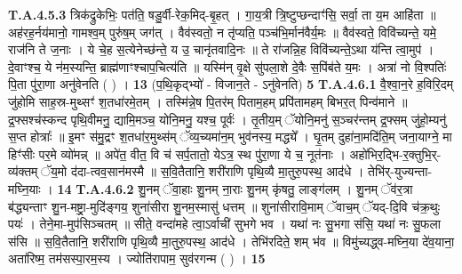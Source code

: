 \documentclass[17pt]{extarticle}
\begin{document}
                  \newline
                                                                  \textbf{ T.A.4.5.3} \newline
                  त्रिक॑द्रुकेभिः॒ पत॑ति॒ षडु॒र्वी-रेक॒मिद्-बृ॒हत् ।  गा॒य॒त्री त्रि॒ष्टुप्छन्दाꣳ॑सि॒ सर्वा॒ ता य॒म आहि॑ता ॥  अह॑रह॒र्नय॑मानो॒ गामश्व॒म् पुरु॑ष॒म् जग॑त् ।  वैव॑स्वतो॒ न तृ॑प्यति॒ पञ्च॑भि॒र्मान॑वैर्य॒मः ॥  वैव॑स्वते॒ विवि॑च्यन्ते॒ यमे॒ राज॑नि ते ज॒नाः ।  ये चे॒ह स॒त्येनेच्छ॑न्ते॒ य उ॒ चानृ॑तवादि॒नः ॥  ते रा॑जन्नि॒ह विवि॑च्यन्ते॒ऽथा य॑न्ति त्वा॒मुप॑ ।  दे॒वाꣳश्च॒ ये न॑म॒स्यन्ति॒ ब्राह्म॑णाꣳश्चाप॒चित्य॑ति ॥  यस्मि॑न् वृ॒क्षे सु॑पला॒शे दे॒वैः स॒पिंब॑ते य॒मः ।  अत्रा॑ नो वि॒श्पतिः॑ पि॒ता पु॑रा॒णा अनु॑वेनति ( ) । \textbf{ 13} \newline
                  \newline
                                                        (प॒थि॒कृद्भ्यो॑ - विजान॒ते - ऽनु॑वेनति) \textbf{5} \newline \newline
                                \textbf{ T.A.4.6.1} \newline
                  वै॒श्वा॒न॒रे ह॒विरि॒दम् जु॑होमि साह॒स्र-मुथ्सꣳ॑ श॒तधा॑रमे॒तम् । तस्मि॑न्ने॒ष पि॒तर॑म् पिताम॒हम् प्रपि॑तामहम् बिभर॒त् पिन्व॑माने ॥  द्र॒फ्सश्च॑स्कन्द पृथि॒वीमनु॒ द्यामि॒मञ्च॒ योनि॒मनु॒ यश्च॒ पूर्वः॑ ।  तृ॒तीय॒म् ॅयोनि॒मनु॑ स॒ञ्चर॑न्तम् द्र॒फ्सम् जु॑हो॒म्यनु॑ स॒प्त होत्राः᳚ ॥  इ॒मꣳ स॑मु॒द्रꣳ श॒तधा॑र॒मुथ्स॑म् ॅव्य॒च्यमा॑न॒म् भुव॑नस्य॒ मद्ध्ये᳚ ।  घृ॒तम् दुहा॑ना॒मदि॑ति॒म् जना॒याग्ने॒ मा हिꣳ॑सीः पर॒मे व्यो॑मन्न् ॥ अपे॑त॒ वीत॒ वि च॑ सर्प॒तातो॒ येऽत्र॒ स्थ पु॑रा॒णा ये च॒ नूत॑नाः ।  अहो॑भिर॒द्भि-र॒क्तुभि॒र्-व्य॑क्तम् ॅय॒मो द॑दा-त्वव॒सान॑मस्मै ॥ स॒वि॒तैतानि॒ शरी॑राणि पृथि॒व्यै मा॒तुरु॒पस्थ॒ आद॑धे ।  तेभि॑र्-युज्यन्ता-मघ्नि॒याः । \textbf{ 14} \newline
                  \newline
                                                                  \textbf{ T.A.4.6.2} \newline
                  शु॒नम् ॅवा॒हाः शु॒नम् ना॒राः शु॒नम् कृ॑षतु॒ लाङ्ग॑लम् ।  शु॒नम् ॅव॑र॒त्रा ब॑द्ध्यन्ताꣳ शु॒न-मष्ट्रा॒-मुदि॑ङ्गय॒ शुना॑सीरा शु॒नम॒स्मासु॑ धत्तम् ॥  शुना॑सीरावि॒माम् ॅवाच॒म् ॅयद्-दि॒वि च॑क्र॒थुः पयः॑ । तेने॒मा-मुप॑सिञ्चतम् ॥  सीते॒ वन्दा॑महे त्वा॒ऽर्वाची॑ सुभगे भव ।  यथा॑ नः सु॒भगा स॑सि॒ यथा॑ नः सु॒फला स॑सि ॥  स॒वि॒तैतानि॒ शरी॑राणि पृथि॒व्यै मा॒तुरु॒पस्थ॒ आद॑धे । तेभि॑रदिते॒ शम् भ॑व ॥  विमु॑च्यद्ध्व-मघ्नि॒या दे॑व॒याना॒ अता॑रिष्म॒ तम॑सस्पा॒रम॒स्य ।  ज्योति॑रापाम॒ सुव॑रगन्म ( ) । \textbf{ 15} \newline
\end{document}
